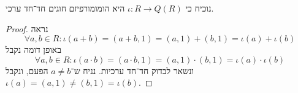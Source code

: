 \Subquestion{}
נוכיח כי $\iota : R \to Q(R)$ היא הומומורפיזם חוגים חד־חד ערכי.
\begin{proof}
	נראה
	\[
		\forall a, b \in R : \iota(a + b) = (a + b, 1) = (a, 1) + (b, 1) = \iota(a) + \iota(b)
	\]
	באופן דומה נקבל
	\[
		\forall a, b \in R : \iota(a \cdot b) = (a \cdot b, 1) = (a, 1) \cdot (b, 1) = \iota(a) \cdot \iota(b)
	\]
	ונשאר לבדוק חד־חד ערכיות.
	נניח ש־$a \ne b$ הפעם, ונקבל $\iota(a) = (a, 1) \ne (b, 1) = \iota(b)$.
\end{proof}


